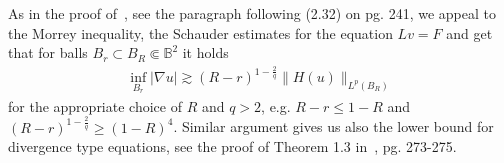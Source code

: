 \documentclass[11pt,a4paper,reqno]{amsart}
\theoremstyle{definition}
\def\vint{\mathop{\mathchoice%
          {\setbox0\hbox{$\displaystyle\intop$}\kern 0.22\wd0%
           \vcenter{\hrule width 0.6\wd0}\kern -0.82\wd0}%
          {\setbox0\hbox{$\textstyle\intop$}\kern 0.2\wd0%
           \vcenter{\hrule width 0.6\wd0}\kern -0.8\wd0}%
          {\setbox0\hbox{$\scriptstyle\intop$}\kern 0.2\wd0%
           \vcenter{\hrule width 0.6\wd0}\kern -0.8\wd0}%
          {\setbox0\hbox{$\scriptscriptstyle\intop$}\kern 0.2\wd0%
           \vcenter{\hrule width 0.6\wd0}\kern -0.8\wd0}}%
          \mathopen{}\int}
\newcommand{\BB}{\mathbb{B}^2}
\numberwithin{komcounter}{section}
\begin{document}
As in the proof of~\cite[Theorem 2.1]{al2}, see the paragraph following (2.32) on pg. 241, we appeal to the Morrey inequality, the Schauder estimates for the equation $Lv=F$ and get that for balls $B_r\subset B_R\Subset \BB$ it holds
\begin{align*}
 \inf_{B_r}|\nabla u| \gtrsim (R-r)^{1-\frac{2}{q}} \|H(u)\|_{L^p(B_R)} 
\end{align*}
for the appropriate choice of $R$ and $q>2$, e.g. $R-r\leq 1-R$ and $(R-r)^{1-\frac{2}{q}} \geq (1-R)^{4}$.
Similar argument gives us also the lower bound for divergence type equations, see the proof of Theorem 1.3 in~\cite{al1}, pg. 273-275.
\end{document}
